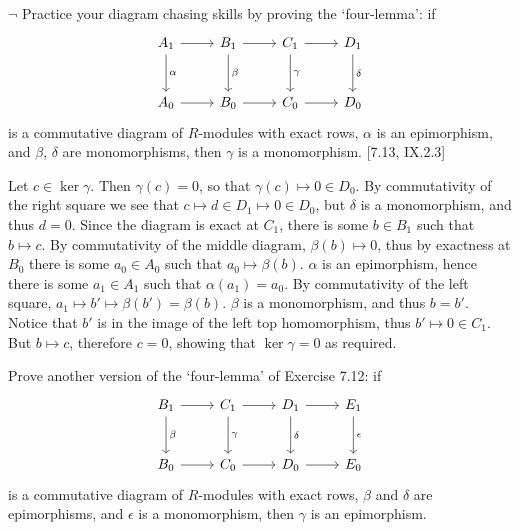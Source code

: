 \begin{problem}
	$\neg$ Practice your diagram chasing skills by proving the `four-lemma': if
	\[
		\begin{tikzcd}[row sep=large]
			A_1
			\arrow[r]
			\arrow[d, "\alpha"]
			& B_1
			\arrow[r]
			\arrow[d, "\beta"]
			& C_1
			\arrow[r]
			\arrow[d, "\gamma"]
			& D_1
			\arrow[d, "\delta"] \\
			A_0
			\arrow[r]
			& B_0
			\arrow[r]
			& C_0
			\arrow[r]
			& D_0
		\end{tikzcd}
	\]
	is a commutative diagram of $R$-modules with exact rows, $\alpha$ is an epimorphism, and $\beta$, $\delta$ are monomorphisms, then $\gamma$ is a monomorphism. [7.13, IX.2.3]
\end{problem}

\begin{solution}
	Let $c \in \ker \gamma$. Then $\gamma(c) = 0$, so that $\gamma(c) \mapsto 0 \in D_0$. By commutativity of the right square we see that $c \mapsto d \in D_1 \mapsto 0 \in D_0$, but $\delta$ is a monomorphism, and thus $d = 0$. Since the diagram is exact at $C_1$, there is some $b \in B_1$ such that $b \mapsto c$. By commutativity of the middle diagram, $\beta(b) \mapsto 0$, thus by exactness at $B_0$ there is some $a_0 \in A_0$ such that $a_0 \mapsto \beta(b)$. $\alpha$ is an epimorphism, hence there is some $a_1 \in A_1$ such that $\alpha(a_1) = a_0$. By commutativity of the left square, $a_1 \mapsto b' \mapsto \beta(b') = \beta(b)$. $\beta$ is a monomorphism, and thus $b = b'$. Notice that $b'$ is in the image of the left top homomorphism, thus $b' \mapsto 0 \in C_1$. But $b \mapsto c$, therefore $c = 0$, showing that $\ker \gamma = 0$ as required.
\end{solution}

\begin{problem}
	Prove another version of the `four-lemma' of Exercise 7.12: if
	\[
		\begin{tikzcd}[row sep=large]
			B_1
			\arrow[r]
			\arrow[d, "\beta"]
			& C_1
			\arrow[r]
			\arrow[d, "\gamma"]
			& D_1
			\arrow[r]
			\arrow[d, "\delta"]
			& E_1
			\arrow[d, "\epsilon"] \\
			B_0
			\arrow[r]
			& C_0
			\arrow[r]
			& D_0
			\arrow[r]
			& E_0
		\end{tikzcd}
	\]
	is a commutative diagram of $R$-modules with exact rows, $\beta$ and $\delta$ are epimorphisms, and $\epsilon$ is a monomorphism, then $\gamma$ is an epimorphism.
\end{problem}


